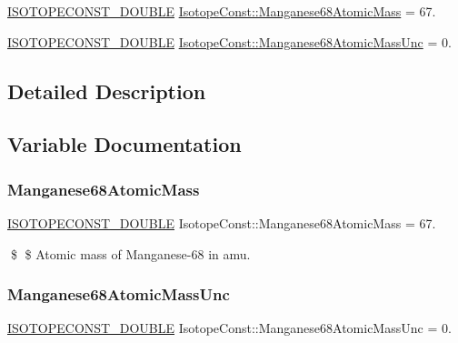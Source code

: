 \begin{DoxyCompactItemize}
\item 
\mbox{\hyperlink{group___isotope_const-_macros_ga8f45a7272ce02c0b4c65c44636ed719a}{I\+S\+O\+T\+O\+P\+E\+C\+O\+N\+S\+T\+\_\+\+D\+O\+U\+B\+LE}} \mbox{\hyperlink{group___isotope_const-_manganese-_mn68_ga800cf866f2a588d7a4d7f547d5743827}{Isotope\+Const\+::\+Manganese68\+Atomic\+Mass}} = 67.
\item 
\mbox{\hyperlink{group___isotope_const-_macros_ga8f45a7272ce02c0b4c65c44636ed719a}{I\+S\+O\+T\+O\+P\+E\+C\+O\+N\+S\+T\+\_\+\+D\+O\+U\+B\+LE}} \mbox{\hyperlink{group___isotope_const-_manganese-_mn68_ga32bccb7273f7117f08a6b2cb3307b1f7}{Isotope\+Const\+::\+Manganese68\+Atomic\+Mass\+Unc}} = 0.
\end{DoxyCompactItemize}


\subsection{Detailed Description}


\subsection{Variable Documentation}
\mbox{\label{group___isotope_const-_manganese-_mn68_ga800cf866f2a588d7a4d7f547d5743827}} 
\subsubsection{\texorpdfstring{Manganese68\+Atomic\+Mass}{Manganese68AtomicMass}}
{\footnotesize\ttfamily \mbox{\hyperlink{group___isotope_const-_macros_ga8f45a7272ce02c0b4c65c44636ed719a}{I\+S\+O\+T\+O\+P\+E\+C\+O\+N\+S\+T\+\_\+\+D\+O\+U\+B\+LE}} Isotope\+Const\+::\+Manganese68\+Atomic\+Mass = 67.}

\$ \$ Atomic mass of Manganese-\/68 in amu. \mbox{\label{group___isotope_const-_manganese-_mn68_ga32bccb7273f7117f08a6b2cb3307b1f7}} 
\subsubsection{\texorpdfstring{Manganese68\+Atomic\+Mass\+Unc}{Manganese68AtomicMassUnc}}
{\footnotesize\ttfamily \mbox{\hyperlink{group___isotope_const-_macros_ga8f45a7272ce02c0b4c65c44636ed719a}{I\+S\+O\+T\+O\+P\+E\+C\+O\+N\+S\+T\+\_\+\+D\+O\+U\+B\+LE}} Isotope\+Const\+::\+Manganese68\+Atomic\+Mass\+Unc = 0.}

